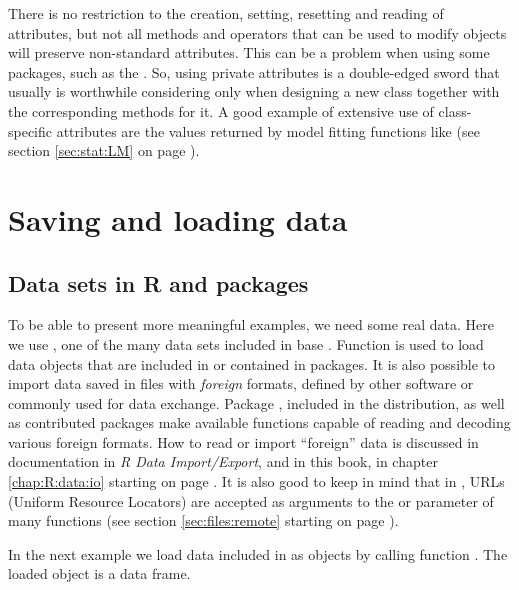 \documentclass[krantz2]{krantz}\usepackage{knitr}
\begin{document}
\begin{warningbox}
There is no restriction to the creation, setting, resetting and reading of attributes, but not all methods and operators that can be used to modify objects will preserve non-standard attributes. This can be a problem when using some \Rlang packages, such as the . So, using private attributes is a double-edged sword that usually is worthwhile considering only when designing a new class together with the corresponding methods for it. A good example of extensive use of class-specific attributes are the values returned by model fitting functions like  (see section \ref{sec:stat:LM} on page \pageref{sec:stat:LM}).
\end{warningbox}




\section{Saving and loading data}

\subsection{Data sets in R and packages}
To be able to present more meaningful examples, we need some real data. Here we use , one of the many data sets included in base \Rpgrm. Function  is used to load data objects that are included in \Rlang or contained in packages. It is also possible to import data saved in files with \textit{foreign} formats, defined by other software or commonly used for data exchange. Package , included in the \Rlang distribution, as well as contributed packages make available functions capable of reading and decoding various foreign formats. How to read or import ``foreign'' data is discussed in \Rlang documentation in \emph{R Data Import/Export}, and in this book, in chapter \ref{chap:R:data:io} starting on page \pageref{chap:R:data:io}. It is also good to keep in mind that in \Rlang, URLs (Uniform Resource Locators) are accepted as arguments to the  or  parameter of many functions (see section \ref{sec:files:remote} starting on page \pageref{sec:files:remote}).

In the next example we load data included in \Rlang as \Rlang objects by calling function . The loaded \Rlang object  is a data frame.
\end{document}
